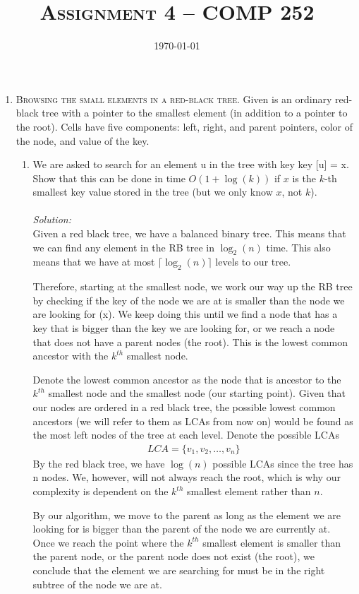 \documentclass[12pt]{article}
\title{\textsc{Assignment 4 -- COMP 252}}
\author{\it \nameone \nametwo}
\date{\today}
\theoremstyle{definition}
\theoremstyle{remark}
\newcommand\sol{%
  \\ 
  \\
  \textit{Solution:}\\%
}
\begin{document}
\maketitle 
\thispagestyle{empty} %
\begin{enumerate}
  \item \textsc{Browsing the small elements in a red-black tree}. Given is an ordinary red-black tree with a pointer to the smallest element (in addition to a pointer to the root). Cells have five components: left, right, and parent pointers, color of the node, and value of the key.
\begin{enumerate}
  \item We are asked to search for an element u in the tree with key key [u] = x. Show that this can
be done in time $O(1 + \log(k))$ if $x$ is the $k$-th smallest key value stored in the tree (but we only know $x$, not $k$).
\sol
Given a red black tree, we have a balanced binary tree. This means that we can find any element in the RB tree in $\log_2(n)$ time. This also means that we have at most $\lceil \log_2(n)\rceil$ levels to our tree. 

Therefore, starting at the smallest node, we work our way up the RB tree by checking if the key of the node we are at is smaller than the node we are looking for (x). We keep doing this until we find a node that has a key that is bigger than the key we are looking for, or we reach a node that does not have a parent nodes (the root). This is the lowest common ancestor with the $k^{th}$ smallest node. 


Denote the lowest common ancestor as the node that is ancestor to the $k^{th}$ smallest node and the smallest node (our starting point). Given that our nodes are ordered in a red black tree, the possible lowest common ancestors (we will refer to them as LCAs from now on) would be found as the most left nodes of the tree at each level. Denote the possible LCAs
\begin{align*}
    LCA = \{v_1, v_2, \ldots, v_{n}\}
\end{align*}
By the red black tree, we have $\log(n)$ possible LCAs since the tree has n nodes. We, however, will not always reach the root, which is why our complexity is dependent on the $k^{th}$ smallest element rather than $n$. 

By our algorithm, we move to the parent as long as the element we are looking for is bigger than the parent of the node we are currently at. Once we reach the point where the $k^{th}$ smallest element is smaller than the parent node, or the parent node does not exist (the root), we conclude that the element we are searching for must be in the right subtree of the node we are at. 


\end{enumerate}
\end{enumerate}
\end{document}
